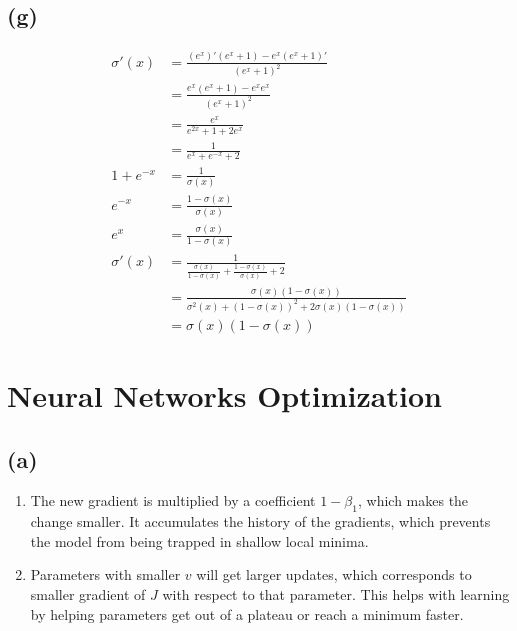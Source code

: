 \documentclass[11pt]{article}
\begin{document}
\subsection*{(g)}
\begin{align*}
  \sigma'(x) &= \frac{(e^x)'(e^x+1)-e^x(e^x+1)'}{(e^x+1)^2} \\
  &= \frac{e^x(e^x+1) - e^x e^x}{(e^x+1)^2}\\
  &= \frac{e^x}{e^{2x}+1+2e^x}\\
  &= \frac{1}{e^x+e^{-x}+2}\\
  1+e^{-x} &= \frac{1}{\sigma(x)}\\
  e^{-x} &= \frac{1-\sigma(x)}{\sigma(x)}\\
  e^{x} &= \frac{\sigma(x)}{1-\sigma(x)}\\
  \sigma'(x) &= \frac{1}{\frac{\sigma(x)}{1-\sigma(x)}+\frac{1-\sigma(x)}{\sigma(x)}+2}\\
  &= \frac{\sigma(x)(1-\sigma(x))}{\sigma^2(x)+(1-\sigma(x))^2+2\sigma(x)(1-\sigma(x))}\\
  &= \sigma(x)(1-\sigma(x))
\end{align*}

\section{Neural Networks Optimization}

\subsection*{(a)}
\begin{enumerate}
  \item The new gradient is multiplied by a coefficient $1-\beta_1$, which makes the change smaller. It accumulates the history of the gradients, which prevents the model from being trapped in shallow local minima.
  \item Parameters with smaller $v$ will get larger updates, which corresponds to smaller gradient of $J$ with respect to that parameter. This helps with learning by helping parameters get out of a plateau or reach a minimum faster.
\end{enumerate}
\end{document}
